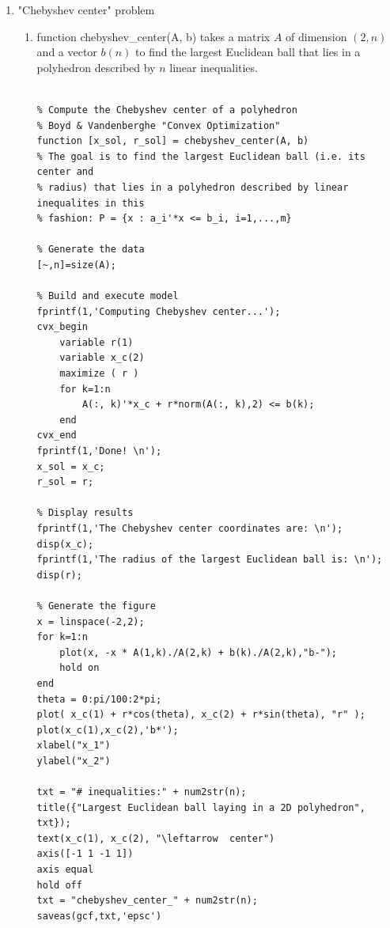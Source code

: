 \documentclass[10pt]{article}
\newcommand{\0}{\mat{0}}
\begin{document}
\begin{enumerate}
\item  "Chebyshev center" problem

\begin{enumerate}
\item function  chebyshev\_center(A, b) takes a matrix $A$ of dimension $(2,n)$ and a vector $b(n)$ to find the  largest Euclidean ball
that lies in a polyhedron described by $n$ linear inequalities.
 
\begin{verbatim}

% Compute the Chebyshev center of a polyhedron
% Boyd & Vandenberghe "Convex Optimization"
function [x_sol, r_sol] = chebyshev_center(A, b)
% The goal is to find the largest Euclidean ball (i.e. its center and
% radius) that lies in a polyhedron described by linear inequalites in this
% fashion: P = {x : a_i'*x <= b_i, i=1,...,m}

% Generate the data
[~,n]=size(A);

% Build and execute model
fprintf(1,'Computing Chebyshev center...');
cvx_begin
    variable r(1)
    variable x_c(2)
    maximize ( r )
    for k=1:n
        A(:, k)'*x_c + r*norm(A(:, k),2) <= b(k);
    end
cvx_end
fprintf(1,'Done! \n');
x_sol = x_c;
r_sol = r;

% Display results
fprintf(1,'The Chebyshev center coordinates are: \n');
disp(x_c);
fprintf(1,'The radius of the largest Euclidean ball is: \n');
disp(r);

% Generate the figure
x = linspace(-2,2);
for k=1:n
    plot(x, -x * A(1,k)./A(2,k) + b(k)./A(2,k),"b-");
    hold on
end
theta = 0:pi/100:2*pi;
plot( x_c(1) + r*cos(theta), x_c(2) + r*sin(theta), "r" );
plot(x_c(1),x_c(2),'b*');
xlabel("x_1")
ylabel("x_2")

txt = "# inequalities:" + num2str(n);
title({"Largest Euclidean ball laying in a 2D polyhedron", txt});
text(x_c(1), x_c(2), "\leftarrow  center")
axis([-1 1 -1 1])
axis equal
hold off
txt = "chebyshev_center_" + num2str(n);
saveas(gcf,txt,'epsc')

\end{verbatim}


\end{enumerate}
\end{enumerate}
\end{document}
